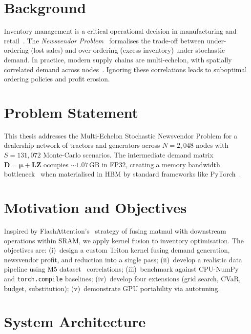 \section{Background}\label{sec:background}

Inventory management is a critical operational decision in manufacturing and retail~\citep{silver2017}. The \emph{Newsvendor Problem}~\citep{arrow1951, porteus2002} formalises the trade-off between under-ordering (lost sales) and over-ordering (excess inventory) under stochastic demand. In practice, modern supply chains are multi-echelon, with spatially correlated demand across nodes~\citep{clark1960, graves2000}. Ignoring these correlations leads to suboptimal ordering policies and profit erosion.

\section{Problem Statement}\label{sec:problem}

This thesis addresses the Multi-Echelon Stochastic Newsvendor Problem for a dealership network of tractors and generators across $N = 2{,}048$ nodes with $S = 131{,}072$ Monte-Carlo scenarios. The intermediate demand matrix $\mathbf{D} = \bm{\mu} + \mathbf{L}\mathbf{Z}$ occupies ${\sim}1.07$\,GB in FP32, creating a memory bandwidth bottleneck~\citep{ivanov2021} when materialised in HBM by standard frameworks like PyTorch~\citep{paszke2019}.

\section{Motivation and Objectives}\label{sec:motivation}

Inspired by FlashAttention's~\citep{dao2022} strategy of fusing matmul with downstream operations within SRAM, we apply kernel fusion to inventory optimisation. The objectives are: (i)~design a custom Triton kernel fusing demand generation, newsvendor profit, and reduction into a single pass; (ii)~develop a realistic data pipeline using M5 dataset~\citep{makridakis2022} correlations; (iii)~benchmark against CPU-NumPy and \texttt{torch.compile} baselines; (iv)~develop four extensions (grid search, CVaR, budget, substitution); (v)~demonstrate GPU portability via autotuning.

\section{System Architecture}\label{sec:sysarch}

